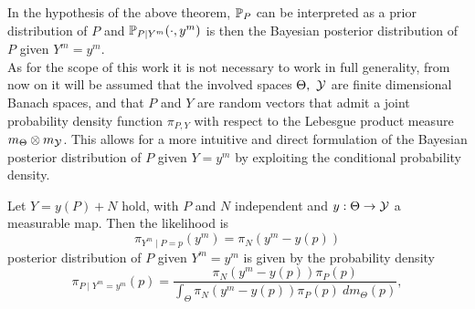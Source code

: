 In the hypothesis of the above theorem, $\mathbb P_P$ can be interpreted as a prior distribution of $P$ and $\mathbb P_{P \mid Y^m}(\cdot, y^m)$ is then the Bayesian posterior distribution of $P$ given $Y^m=y^m$. \\

As for the scope of this work it is not necessary to work in full generality, from now on it will be assumed that the involved spaces $\Theta, \  \mathcal Y$ are finite dimensional Banach spaces, and that $P$ and $Y$ are random vectors that admit a joint probability density function $\pi_{P,Y}$ with respect to the Lebesgue product measure $m_\Theta \otimes m_\mathcal Y$. This allows for a more intuitive and direct formulation of the Bayesian posterior distribution of $P$ given $Y=y^m$ by exploiting the conditional probability density.

\begin{thm}
    Let $Y = y(P) + N$ hold, with $P$ and $N$ independent and $y: \Theta \rightarrow \mathcal Y$ a measurable map.
    Then the likelihood is \[
        \pi_{Y^m\mid P = p}(y^m) = \pi_{N}(y^m - y( p) )
    \] posterior distribution of $P$ given $Y^m=y^m$ is given by the probability density \begin{equation}\label{eq:Bayes}
        \pi_{P\mid Y^m = y^m}(p) = \frac{\pi_{N}(y^m - y( p) ) \pi_P(p)}{\int_\Theta  \pi_{N}(y^m - y( p) ) \pi_P(p) \ dm_\Theta(p)},
    \end{equation}
\end{thm}